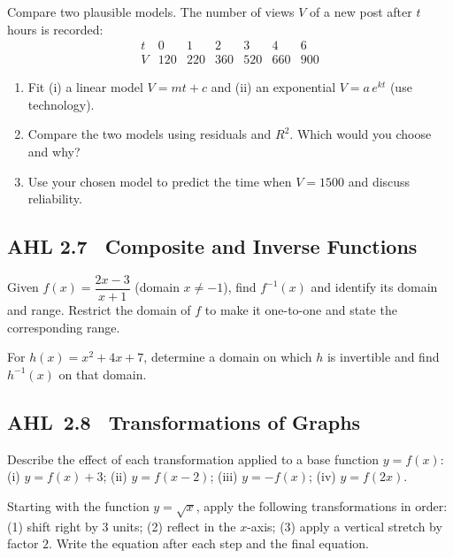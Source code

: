 \documentclass[11pt]{article}
\def\textbf#1{#1}%
\newcommand{\tocsubsection}[1]{\subsection{#1}}
\newcounter{question}
\begin{document}
\begin{question}
\textbf{Compare two plausible models.}
The number of views $V$ of a new post after $t$ hours is recorded:
\[
\begin{array}{c|cccccc}
t & 0 & 1 & 2 & 3 & 4 & 6\\\hline
V & 120 & 220 & 360 & 520 & 660 & 900
\end{array}
\]
\begin{enumerate}
  \item Fit (i) a linear model $V=mt+c$ and (ii) an exponential $V=a\,e^{kt}$ (use technology).
  \item Compare the two models using residuals and $R^2$. Which would you choose and why?
  \item Use your chosen model to predict the time when $V=1500$ and discuss reliability.
\end{enumerate}
\end{question}









\tocsubsection{AHL 2.7 \; Composite and Inverse Functions}



\begin{question}
Given $f(x)=\dfrac{2x-3}{x+1}$ (domain $x\neq -1$), find $f^{-1}(x)$ and
identify its domain and range.  Restrict the domain of $f$ to make it
one-to-one and state the corresponding range.
\end{question}

\begin{question}
For $h(x)=x^2+4x+7$, determine a domain on which $h$ is invertible and find
$h^{-1}(x)$ on that domain.
\end{question}






\tocsubsection{AHL 2.8 \; Transformations of Graphs}

\begin{question}
Describe the effect of each transformation applied to a base function $y=f(x)$:
(i) $y=f(x)+3$; (ii) $y=f(x-2)$; (iii) $y=-f(x)$; (iv) $y=f(2x)$.
\end{question}

\begin{question}
Starting with the function $y=\sqrt{x}$, apply the following transformations in
order: (1) shift right by $3$ units; (2) reflect in the $x$-axis; (3) apply a
vertical stretch by factor $2$.  Write the equation after each step and the
final equation.
\end{question}
\end{document}
